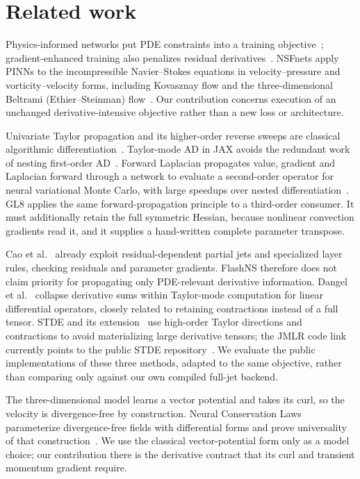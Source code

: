 \documentclass[11pt]{article}
\begin{document}
\section{Related work}
Physics-informed networks put PDE constraints into a training
objective~\cite{pinn}; gradient-enhanced training also penalizes residual
derivatives~\cite{gpinn}. NSFnets apply PINNs to the incompressible
Navier--Stokes equations in velocity--pressure and vorticity--velocity
forms, including Kovasznay flow and the three-dimensional
Beltrami (Ethier--Steinman) flow~\cite{nsfnets}.
Our contribution concerns execution of an unchanged derivative-intensive
objective rather than a new loss or architecture.

Univariate Taylor propagation and its higher-order reverse sweeps are
classical algorithmic differentiation~\cite{griewank}. Taylor-mode AD in
JAX avoids the redundant work of nesting first-order AD~\cite{taylorjax}.
Forward Laplacian propagates value, gradient and Laplacian forward through
a network to evaluate a second-order operator for neural variational Monte
Carlo, with large speedups over nested differentiation~\cite{fwdlap}. GL8
applies the same forward-propagation principle to a third-order consumer.
It must additionally retain the full symmetric Hessian, because nonlinear
convection gradients read it, and it supplies a hand-written complete
parameter transpose.

Cao et al.~\cite{cao} already exploit residual-dependent partial jets
and specialized layer rules, checking residuals and parameter gradients.
FlashNS therefore does not claim priority for propagating only
PDE-relevant derivative information. Dangel et al.~\cite{cmtad} collapse
derivative sums within Taylor-mode computation for linear differential
operators, closely related to retaining contractions instead of a full
tensor. STDE and its extension~\cite{stde,stdepp} use high-order Taylor
directions and contractions to avoid materializing large derivative
tensors; the JMLR code link currently points to the public STDE
repository~\cite{stdecode}. We evaluate the public implementations of these
three methods, adapted to the same objective, rather than comparing only
against our own compiled full-jet backend.

The three-dimensional model learns a vector potential and takes its curl,
so the velocity is divergence-free by construction. Neural Conservation
Laws parameterize divergence-free fields with differential forms and prove
universality of that construction~\cite{ncl}. We use the classical
vector-potential form only as a model choice; our contribution there is
the derivative contract that its curl and transient momentum gradient
require.
\end{document}
